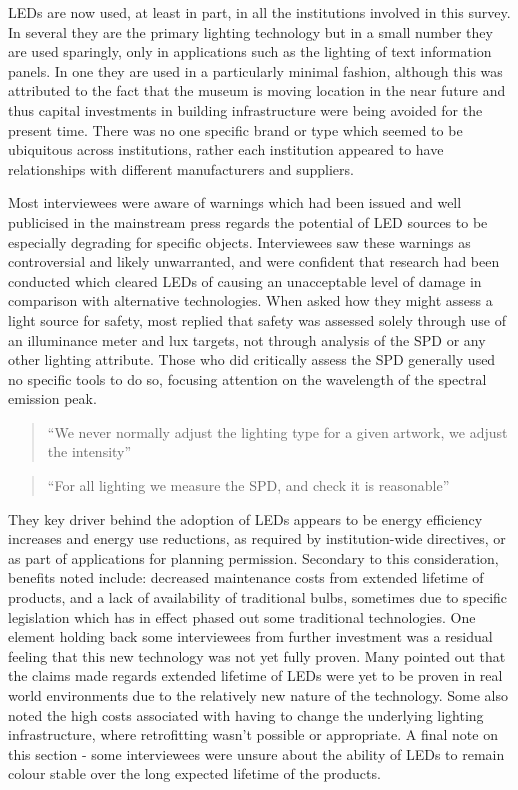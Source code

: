 \Glspl{LED} are now used, at least in part, in all the institutions involved in this survey. In several they are the primary lighting technology but in a small number they are used sparingly, only in applications such as the lighting of text information panels. In one they are used in a particularly minimal fashion, although this was attributed to the fact that the museum is moving location in the near future and thus capital investments in building infrastructure were being avoided for the present time. There was no one specific brand or type which seemed to be ubiquitous across institutions, rather each institution appeared to have relationships with different manufacturers and suppliers.

Most interviewees were aware of warnings which had been issued and well publicised in the mainstream press \citep{lewis_smith_will_2013} regards the potential of \gls{LED} sources to be especially degrading for specific objects. Interviewees saw these warnings as controversial and likely unwarranted, and were confident that research had been conducted which cleared \Glspl{LED} of causing an unacceptable level of damage in comparison with alternative technologies. When asked how they might assess a light source for safety, most replied that safety was assessed solely through use of an illuminance meter and lux targets, not through analysis of the \gls{SPD} or any other lighting attribute. Those who did critically assess the \gls{SPD} generally used no specific tools to do so, focusing attention on the wavelength of the spectral emission peak.

\begin{quote}
``We never normally adjust the lighting type for a given artwork, we adjust the intensity''
\end{quote}

\begin{quote}
``For all lighting we measure the \gls{SPD}, and check it is reasonable''
\end{quote}

They key driver behind the adoption of \Glspl{LED} appears to be energy efficiency increases and energy use reductions, as required by institution-wide directives, or as part of applications for planning permission. Secondary to this consideration, benefits noted include: decreased maintenance costs from extended lifetime of products, and a lack of availability of traditional bulbs, sometimes due to specific legislation which has in effect phased out some traditional technologies. One element holding back some interviewees from further investment was a residual feeling that this new technology was not yet fully proven. Many pointed out that the claims made regards extended lifetime of \Glspl{LED} were yet to be proven in real world environments due to the relatively new nature of the technology. Some also noted the high costs associated with having to change the underlying lighting infrastructure, where retrofitting wasn't possible or appropriate. A final note on this section - some interviewees were unsure about the ability of \Glspl{LED} to remain colour stable over the long expected lifetime of the products.


